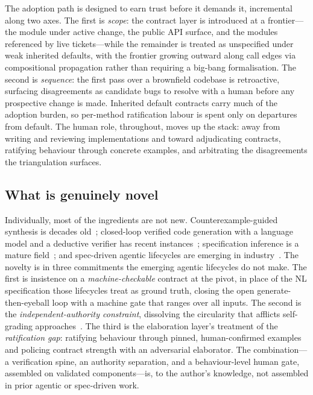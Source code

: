 The adoption path is designed to earn trust before it demands it, incremental along two axes. The first is \emph{scope}: the contract layer is introduced at a frontier---the module under active change, the public API surface, and the modules referenced by live tickets---while the remainder is treated as unspecified under weak inherited defaults, with the frontier growing outward along call edges via compositional propagation rather than requiring a big-bang formalisation. The second is \emph{sequence}: the first pass over a brownfield codebase is retroactive, surfacing disagreements as candidate bugs to resolve with a human before any prospective change is made. Inherited default contracts carry much of the adoption burden, so per-method ratification labour is spent only on departures from default. The human role, throughout, moves up the stack: away from writing and reviewing implementations and toward adjudicating contracts, ratifying behaviour through concrete examples, and arbitrating the disagreements the triangulation surfaces.

\subsection{What is genuinely novel}\label{subsec:a5-novelty}

Individually, most of the ingredients are not new. Counterexample-guided synthesis is decades old~\cite{solarlezama2008sketching,alur2013sygus}; closed-loop verified code generation with a language model and a deductive verifier has recent instances~\cite{sun2024clover,misu2024dafny,mugnier2025dafnypro}; specification inference is a mature field~\cite{ernst2007daikon,ma2025specgen,endres2024nl2postcond}; and spec-driven agentic lifecycles are emerging in industry~\cite{githubspeckit,awsaidlc,awskiro}. The novelty is in three commitments the emerging agentic lifecycles do not make. The first is insistence on a \emph{machine-checkable} contract at the pivot, in place of the NL specification those lifecycles treat as ground truth, closing the open generate-then-eyeball loop with a machine gate that ranges over all inputs. The second is the \emph{independent-authority constraint}, dissolving the circularity that afflicts self-grading approaches~\cite{liu2026oracle,barr2015oracle}. The third is the elaboration layer's treatment of the \emph{ratification gap}: ratifying behaviour through pinned, human-confirmed examples and policing contract strength with an adversarial elaborator. The combination---a verification spine, an authority separation, and a behaviour-level human gate, assembled on validated components---is, to the author's knowledge, not assembled in prior agentic or spec-driven work.

